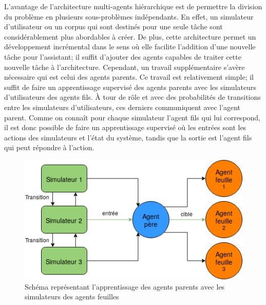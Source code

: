 L'avantage de l'architecture multi-agents hiérarchique est de permettre la division du problème en plusieurs sous-problèmes indépendants. En effet, un simulateur d'utilisateur ou un corpus qui sont destinés pour une seule tâche sont considérablement plus abordables à créer. De plus, cette architecture permet un développement incrémental dans le sens où elle facilite l'addition d'une nouvelle tâche pour l'assistant; il suffit d'ajouter des agents capables de traiter cette nouvelle tâche à l'architecture. Cependant, un travail supplémentaire s'avère nécessaire qui est celui des agents parents. Ce travail est relativement simple; il suffit de faire un apprentissage supervisé des agents parents avec les simulateurs d'utilisateurs des agents fils. À tour de rôle et avec des probabilités de transitions entre les simulateurs d'utilisateurs, ces derniers communiquent avec l'agent parent. Comme on connaît pour chaque simulateur l'agent fils qui lui correspond, il est donc possible de faire un apprentissage supervisé où les entrées sont les actions des simulateurs et l'état du système, tandis que la sortie est l'agent fils qui peut répondre à l'action.
\begin{figure}[H] 
	
	\centering
	\includegraphics[width=0.5\linewidth]{images/Conception/DM/train_parent.png}
	\caption{Schéma représentant l'apprentissage des agents parents avec les simulateurs des agents feuilles}
\end{figure}\label{train_parent}
